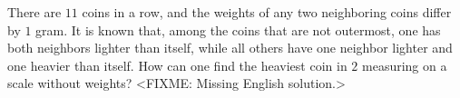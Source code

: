 \problem{}
There are $11$ coins in a row, and the weights of any two neighboring coins
differ by $1$ gram.
It is known that, among the coins that are not outermost, one has both
neighbors lighter than itself, while all others have one neighbor lighter and
one heavier than itself.
How can one find the heaviest coin in $2$ measuring on a scale without weights?
\solution
<FIXME: Missing English solution.>
\endproblem
